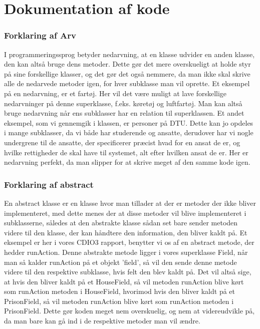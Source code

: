 \section{Dokumentation af kode}

\subsubsection{Forklaring af Arv}
I programmeringssprog betyder nedarvning, at en klasse udvider en anden klasse, den kan altså bruge dens metoder. Dette gør det mere overskueligt at holde styr på sine forskellige klasser, og det gør det også nemmere, da man ikke skal skrive alle de nedarvede metoder igen, for hver subklasse man vil oprette. Et eksempel på en nedarvning, er et fartøj. Her vil det være muligt at lave forskellige nedarvninger på denne superklasse, f.eks. køretøj og luftfartøj. Man kan altså bruge nedarvning når ens subklasser har en relation til superklassen. Et andet eksempel, som vi gennemgik i klassen, er personer på DTU. Dette kan jo opdeles i mange subklasser, da vi både har studerende og ansatte, derudover har vi nogle undergrene til de ansatte, der specificerer præcist hvad for en ansat de er, og hvilke rettigheder de skal have til systemet, alt efter hvilken ansat de er. Her er nedarvning perfekt, da man slipper for at skrive meget af den samme kode igen.

\subsubsection{Forklaring af abstract}
En abstract klasse er en klasse hvor man tillader at der er metoder der ikke bliver implementeret, med dette menes der at disse metoder vil blive implementeret i subklasserne, således at den abstrakte klasse sådan set bare sender metoden videre til den klasse, der kan håndtere den information, den bliver kaldt på. Et eksempel er her i vores CDIO3 rapport, benytter vi os af en abstract metode, der hedder runAction. Denne abstrakte metode ligger i vores superklasse Field, når man så kalder runAction på et objekt 'field', så vil den sende denne metode videre til den respektive subklasse, hvis felt den blev kaldt på. Det vil altså sige, at hvis den bliver kaldt på et HouseField, så vil metoden runAction blive kørt som runAction metoden i HouseField, hvorimod hvis den bliver kaldt på et PrisonField, så vil metoden runAction blive kørt som runAction metoden i PrisonField. Dette gør koden meget nem overskuelig, og nem at videreudvikle på, da man bare kan gå ind i de respektive metoder man vil ændre.

